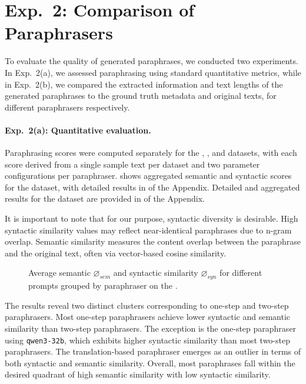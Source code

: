 \section{Exp.\ 2: Comparison of Paraphrasers}
\label{sec:comp_paraphrases}

To evaluate the quality of generated paraphrases, we conducted two experiments. 
In Exp.\ 2(a), we assessed paraphrasing using standard quantitative metrics, while in Exp.\ 2(b), we compared the extracted information and text lengths of the generated paraphrases to the ground truth metadata and original texts, for different paraphrasers respectively.

\paragraph{Exp.\ 2(a): Quantitative evaluation.}

Paraphrasing scores were computed separately for the \dataBlog{}, \dataGutenberg{}, and \dataStudent{} datasets, with each score derived from a single sample text per dataset and two parameter configurations per paraphraser.
 shows aggregated semantic and syntactic scores for the \dataBlog{} dataset, with detailed results in  of the Appendix. 
Detailed and aggregated results for the \dataGutenberg{} dataset are provided in  of the Appendix.

It is important to note that for our purpose, syntactic diversity is desirable.
High syntactic similarity values may reflect near-identical paraphrases due to n-gram overlap. 
Semantic similarity measures the content overlap between the paraphrase and the original text, often via vector-based cosine similarity. 

\begin{figure}[htbp]
    \centering
    
    \caption[Comparison of paraphrasers on the \dataBlog{} dataset]{Average semantic $\diameter_{sem}$ and syntactic similarity $\diameter_{syn}$ for different prompts grouped by paraphraser on the \dataBlog{}.}
    \label{fig:sem_syn_blog}
\end{figure}

The results reveal two distinct clusters corresponding to one-step and two-step paraphrasers. 
Most one-step paraphrasers achieve lower syntactic and semantic similarity than two-step paraphrasers. 
The exception is the one-step paraphraser using \texttt{qwen3-32b}, which exhibits higher syntactic similarity than most two-step paraphrasers. 
The translation-based paraphraser emerges as an outlier in terms of both syntactic and semantic similarity. 
Overall, most paraphrases fall within the desired quadrant of high semantic similarity with low syntactic similarity.

